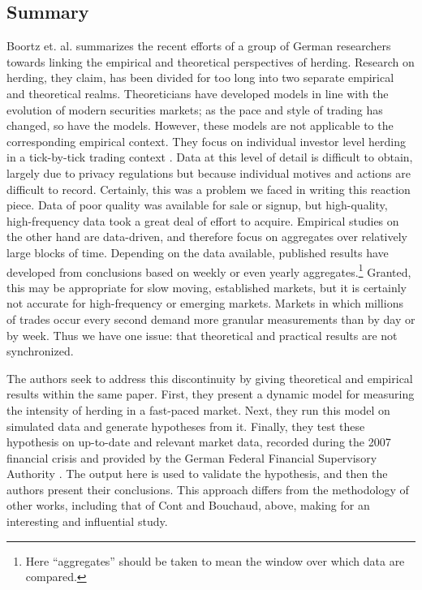 \documentclass{article}
\begin{document}
\subsection{Summary}
  Boortz et. al. summarizes the recent efforts of a group of German researchers towards linking the empirical and theoretical perspectives of herding. 
  Research on herding, they claim, has been divided for too long into two separate empirical and theoretical realms.
  Theoreticians have developed models in line with the evolution of modern securities markets; as the pace and style of trading has changed, so have the models.
  However, these models are not applicable to the corresponding empirical context.
  They focus on individual investor level herding in a tick-by-tick trading context \cite[2]{boortz}.
  Data at this level of detail is difficult to obtain, largely due to privacy regulations but because individual motives and actions are difficult to record.
  Certainly, this was a problem we faced in writing this reaction piece. Data of poor quality was available for sale or signup, but high-quality, high-frequency data took a great deal of effort to acquire.
  Empirical studies on the other hand are data-driven, and therefore focus on aggregates over relatively large blocks of time.
  Depending on the data available, published results have developed from conclusions based on weekly or even yearly aggregates.\footnote{
    Here ``aggregates'' should be taken to mean the window over which data are compared. 
  }
  Granted, this may be appropriate for slow moving, established markets, but it is certainly not accurate for high-frequency or emerging markets.
  Markets in which millions of trades occur every second demand more granular measurements than by day or by week.
  Thus we have one issue: that theoretical and practical results are not synchronized.

  The authors seek to address this discontinuity by giving theoretical and empirical results within the same paper.
  First, they present a dynamic model for measuring the intensity of herding in a fast-paced market.
  Next, they run this model on simulated data and generate hypotheses from it.
  Finally, they test these hypothesis on up-to-date and relevant market data, recorded during the 2007 financial crisis and provided by the German Federal Financial Supervisory Authority \cite[3]{boortz}.
  The output here is used to validate the hypothesis, and then the authors present their conclusions.
  This approach differs from the methodology of other works, including that of Cont and Bouchaud, above, making for an interesting and influential study.
\end{document}
